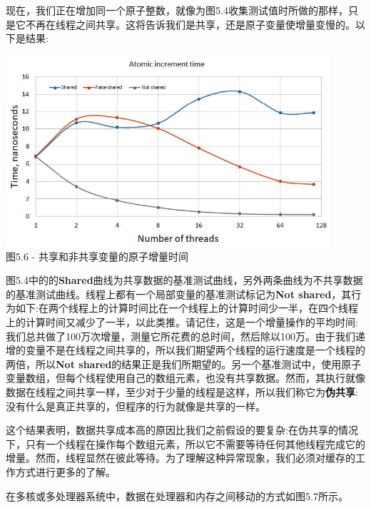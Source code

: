 现在，我们正在增加同一个原子整数，就像为图5.4收集测试值时所做的那样，只是它不再在线程之间共享。这将告诉我们是共享，还是原子变量使增量变慢的。以下是结果:

\begin{center}
\includegraphics[width=0.9\textwidth]{content/1/chapter5/images/6.jpg}\\
图5.6 - 共享和非共享变量的原子增量时间
\end{center}

图5.4中的的\textbf{Shared}曲线为共享数据的基准测试曲线，另外两条曲线为不共享数据的基准测试曲线。线程上都有一个局部变量的基准测试标记为\textbf{Not shared}，其行为如下:在两个线程上的计算时间比在一个线程上的计算时间少一半，在四个线程上的计算时间又减少了一半，以此类推。请记住，这是一个增量操作的平均时间:我们总共做了100万次增量，测量它所花费的总时间，然后除以100万。由于我们递增的变量不是在线程之间共享的，所以我们期望两个线程的运行速度是一个线程的两倍，所以\textbf{Not shared}的结果正是我们所期望的。另一个基准测试中，使用原子变量数组，但每个线程使用自己的数组元素，也没有共享数据。然而，其执行就像数据在线程之间共享一样，至少对于少量的线程是这样，所以我们称它为\textbf{伪共享}:没有什么是真正共享的，但程序的行为就像是共享的一样。

这个结果表明，数据共享成本高的原因比我们之前假设的要复杂:在伪共享的情况下，只有一个线程在操作每个数组元素，所以它不需要等待任何其他线程完成它的增量。然而，线程显然在彼此等待。为了理解这种异常现象，我们必须对缓存的工作方式进行更多的了解。

在多核或多处理器系统中，数据在处理器和内存之间移动的方式如图5.7所示。

